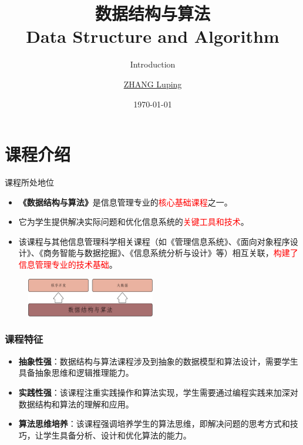 \documentclass{beamer}
\title{数据结构与算法\\ Data Structure and Algorithm}
\subtitle{Introduction}
\author{\href{mailto:zlp@upc.edu.cn}{ZHANG Luping}}
\date{\today}
\begin{document}
\maketitle

\section{课程介绍}

\begin{frame}{课程所处地位}


    \begin{itemize}
        \item \textbf{《数据结构与算法》}是信息管理专业的\textcolor{red}{核心基础课程}之一。
        \item 它为学生提供解决实际问题和优化信息系统的\textcolor{red}{关键工具和技术}。
        \item 该课程与其他信息管理科学相关课程（如《管理信息系统》、《面向对象程序设计》、《商务智能与数据挖掘》、《信息系统分析与设计》等）相互关联，\textcolor{red}{构建了信息管理专业的技术基础}。
    \end{itemize}
    \begin{figure}
        \centering
        \includegraphics[width = 0.5\textwidth]{./images/import.pdf}
    \end{figure}


\end{frame}

\begin{frame}
    \frametitle{课程特征}

    \begin{itemize}
        \item \textbf{抽象性强}：数据结构与算法课程涉及到抽象的数据模型和算法设计，需要学生具备抽象思维和逻辑推理能力。
        \item \textbf{实践性强}：该课程注重实践操作和算法实现，学生需要通过编程实践来加深对数据结构和算法的理解和应用。
        \item \textbf{算法思维培养}：该课程强调培养学生的算法思维，即解决问题的思考方式和技巧，让学生具备分析、设计和优化算法的能力。
    \end{itemize}

\end{frame}
\end{document}
